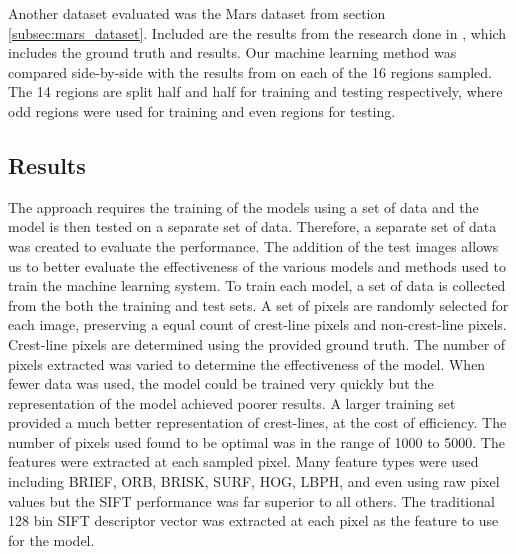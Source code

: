 Another dataset evaluated was the Mars dataset from section \ref{subsec:mars_dataset}. Included are the results from the research done in \cite{vaz_object_based_dune_analysis}, which includes the ground truth and results. Our machine learning method was compared side-by-side with the results from \cite{vaz_object_based_dune_analysis} on each of the 16 regions sampled. The 14 regions are split half and half for training and testing respectively, where odd regions were used for training and even regions for testing. 

\subsection{Results} \label{subsec:results-and-discussion}
The approach requires the training of the models using a set of data and the model is then tested on a separate set of data. Therefore, a separate set of data was created to evaluate the performance. The addition of the test images allows us to better evaluate the effectiveness of the various models and methods used to train the machine learning system. To train each model, a set of data is collected from the both the training and test sets. A set of pixels are randomly selected for each image, preserving a equal count of crest-line pixels and non-crest-line pixels. Crest-line pixels are determined using the provided ground truth. The number of pixels extracted was varied to determine the effectiveness of the model. When fewer data was used, the model could be trained very quickly but the representation of the model achieved poorer results. A larger training set provided a much better representation of crest-lines, at the cost of efficiency. The number of pixels used found to be optimal was in the range of 1000 to 5000. The features were extracted at each sampled pixel. Many feature types were used including BRIEF, ORB, BRISK, SURF, HOG, LBPH, and even using raw pixel values but the SIFT performance was far superior to all others. The traditional 128 bin SIFT descriptor vector was extracted at each pixel as the feature to use for the model.


